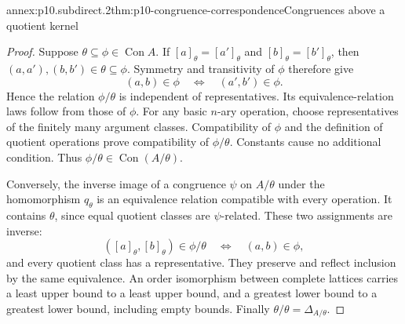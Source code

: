 \begin{annexitem}{annex:p10.subdirect.2}{thm:p10-congruence-correspondence}{Congruences above a quotient kernel}
\begin{proof}
Suppose \(\theta\subseteq\phi\in\operatorname{Con}A\).
If \([a]_\theta=[a']_\theta\) and
\([b]_\theta=[b']_\theta\), then
\((a,a'),(b,b')\in\theta\subseteq\phi\).
Symmetry and transitivity of \(\phi\) therefore give
\[
 (a,b)\in\phi\quad\Longleftrightarrow\quad(a',b')\in\phi.
\]
Hence the relation \(\phi/\theta\) is independent of representatives.
Its equivalence-relation laws follow from those of \(\phi\).
For any basic \(n\)-ary operation, choose representatives of the
finitely many argument classes.  Compatibility of \(\phi\) and
the definition of quotient operations prove compatibility of
\(\phi/\theta\).  Constants cause no additional condition.
Thus \(\phi/\theta\in\operatorname{Con}(A/\theta)\).

Conversely, the inverse image of a congruence \(\psi\) on \(A/\theta\)
under the homomorphism \(q_\theta\) is an equivalence relation
compatible with every operation.  It contains \(\theta\), since
equal quotient classes are \(\psi\)-related.
These two assignments are inverse:
\[
 ([a]_\theta,[b]_\theta)\in\phi/\theta
       \quad\Longleftrightarrow\quad(a,b)\in\phi,
\]
and every quotient class has a representative.
They preserve and reflect inclusion by the same equivalence.
An order isomorphism between complete lattices carries a least
upper bound to a least upper bound, and a greatest lower bound
to a greatest lower bound, including empty bounds.
Finally \(\theta/\theta=\Delta_{A/\theta}\).
\end{proof}
\end{annexitem}


